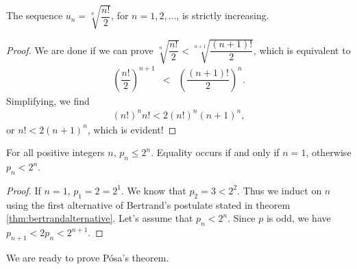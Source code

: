 \documentclass{subfiles}
\begin{document}
	\begin{lemma}
		The sequence $u_n=\sqrt[n]{\dfrac{n!}{2}}$, for $n=1,2,\ldots$, is strictly increasing.\label{lem:n!/2}
	\end{lemma}
	
	\begin{proof}
		We are done if we can prove $\sqrt[n]{\dfrac{n!}{2}}<\sqrt[n+1]{\dfrac{(n+1)!}{2}}$, which is equivalent to
		\begin{eqnarray*}
			\left(\dfrac{n!}{2}\right)^{n+1}  & < & \left(\dfrac{(n+1)!}{2}\right)^n.
		\end{eqnarray*}
		Simplifying, we find
		\begin{eqnarray*}
			(n!)^n n! <  2(n!)^n(n+1)^n,
		\end{eqnarray*}
		or $n!  <  2(n+1)^n$, which is evident!
	\end{proof}
	
	\begin{lemma}
		For all positive integers $n$, $p_{n}\leq 2^{n}$. Equality occurs if and only if $n=1$, otherwise $p_n<2^n$.\label{lem:p_n<2^n}
	\end{lemma}
	
	\begin{proof}
		If $n=1$, $p_1=2=2^1$. We know that $p_2=3<2^2$. Thus we induct on $n$ using the first alternative of Bertrand's postulate stated in theorem \eqref{thm:bertrandalternative}. Let's assume that $p_n<2^n$. Since $p$ is odd, we have $p_{n+1}<2p_n<2^{n+1}$.
	\end{proof}
	
	We are ready to prove P\'{o}sa's theorem.
	
\end{document}

